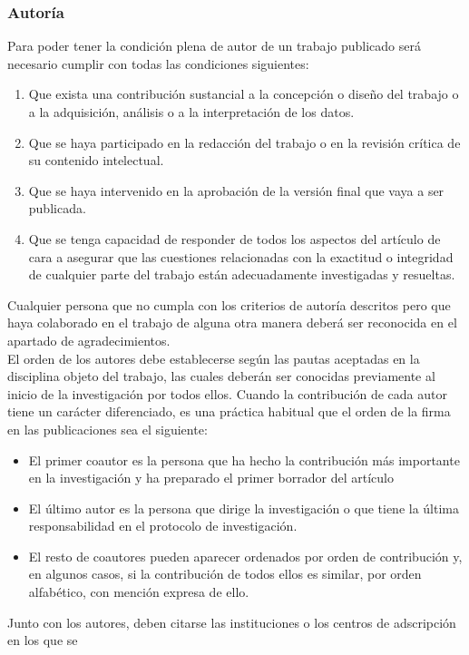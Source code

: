 \subsubsection{Autoría}
Para poder tener la condición plena de autor de un trabajo publicado será necesario cumplir con todas las condiciones siguientes:
\begin{enumerate}
    \item Que exista una contribución sustancial a la concepción o diseño del trabajo o a la adquisición,
    análisis o a la interpretación de los datos.
    \item Que se haya participado en la redacción del trabajo o en la revisión crítica de su contenido
    intelectual.
    \item Que se haya intervenido en la aprobación de la versión final que vaya a ser publicada.
    \item Que se tenga capacidad de responder de todos los aspectos del artículo de cara a asegurar
    que las cuestiones relacionadas con la exactitud o integridad de cualquier parte del trabajo
    están adecuadamente investigadas y resueltas.
\end{enumerate}
Cualquier persona que no cumpla con los criterios de autoría descritos pero que haya colaborado
en el trabajo de alguna otra manera deberá ser reconocida en el apartado de agradecimientos.\\
El orden de los autores debe establecerse según las pautas aceptadas en la disciplina objeto del
trabajo, las cuales deberán ser conocidas previamente al inicio de la investigación por todos ellos.
Cuando la contribución de cada autor tiene un carácter diferenciado, es una práctica habitual que
el orden de la firma en las publicaciones sea el siguiente:
\begin{itemize}
    \item El primer coautor es la persona que ha hecho la contribución más importante en la
    investigación y ha preparado el primer borrador del artículo
    \item El último autor es la persona que dirige la investigación o que tiene la última
    responsabilidad en el protocolo de investigación.
    \item El resto de coautores pueden aparecer ordenados por orden de contribución y, en
    algunos casos, si la contribución de todos ellos es similar, por orden alfabético, con
    mención expresa de ello.
\end{itemize}
Junto con los autores, deben citarse las instituciones o los centros de adscripción en los que se
